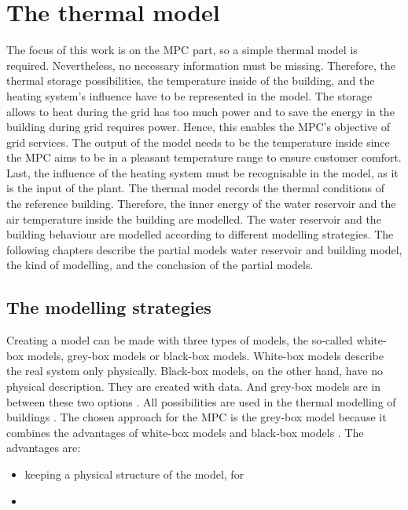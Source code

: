 \section{The thermal model}
\label{thermalmodel}
    The focus of this work is on the MPC part, so a simple thermal model is required. Nevertheless, no necessary information must be missing. Therefore, the thermal storage possibilities, the temperature inside of the building, and the heating system's influence have to be represented in the model. The storage allows to heat during the grid has too much power and to save the energy in the building during grid requires power. Hence, this enables the MPC's objective of grid services. The output of the model needs to be the temperature inside since the MPC aims to be in a pleasant temperature range to ensure customer comfort. Last, the influence of the heating system must be recognisable in the model, as it is the input of the plant.
    \newline
    The thermal model records the thermal conditions of the reference building. Therefore, the inner energy of the water reservoir and the air temperature inside the building are modelled. The water reservoir and the building behaviour are modelled according to different modelling strategies. The following chapters describe the partial models water reservoir and building model, the kind of modelling, and the conclusion of the partial models.
    
    
    \subsection{The modelling strategies}
    \label{ModellingStrategies}
    Creating a model can be made with three types of models, the so-called white-box models, grey-box models or black-box models. White-box models describe the real system only physically. Black-box models, on the other hand, have no physical description. They are created with data. And grey-box models are in between these two options \cite{Statusseminar.ForschungfurEnergieoptimiertesBauen.2009}. All possibilities are used in the thermal modelling of buildings \cite{Kramer.2012}.
    \newline
    The chosen approach for the MPC is the grey-box model because it combines the advantages of white-box models and black-box models \cite{EstradaFlores.2006}. The advantages are: \cite{Coakley.2014}
    \begin{itemize}
     \item keeping a physical structure of the model, for 
     \item 
    \end{itemize}

